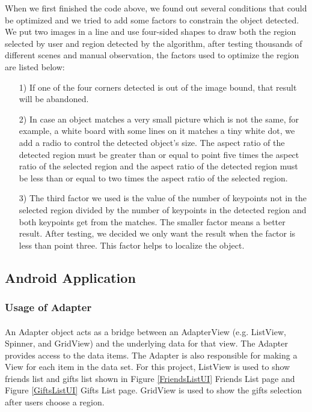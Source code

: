 \par When we first finished the code above, we found out several conditions that could be optimized and we tried to add some factors to constrain the object detected. We put two images in a line and use four-sided shapes to draw both the region selected by user and region detected by the algorithm, after testing thousands of different scenes and manual observation, the factors used to optimize the region are listed below:
\begin{enumerate}
\item[1)] If one of the four corners detected is out of the image bound, that result will be abandoned. 
\item[2)] In case an object matches a very small picture which is not the same, for example, a white board with some lines on it matches a tiny white dot, we add a radio to control the detected object's size. The aspect ratio of the detected region must be greater than or equal to point five times the aspect ratio of  the selected region and the aspect ratio of the detected region must be less than or equal to two times the aspect ratio of the selected region.
\item[3)] The third factor we used is the value of the number of keypoints not in the selected region divided by the number of keypoints in the detected region and both keypoints get from the matches. The smaller factor means a better result. After testing, we decided we only want the result when the factor is less than point three. This factor helps to localize the object.
\end{enumerate}

\subsection{Android Application}
\subsubsection{Usage of Adapter}
\paragraph{}
An Adapter object acts as a bridge between an AdapterView (e.g. ListView, Spinner, and GridView) and the underlying data for that view. The Adapter provides access to the data items. The Adapter is also responsible for making a View for each item in the data set. For this project, ListView is used to show friends list and gifts list shown in Figure \ref{FriendsListUI} Friends List page and Figure \ref{GiftsListUI} Gifts List page. GridView is used to show the gifts selection after users choose a region. 

